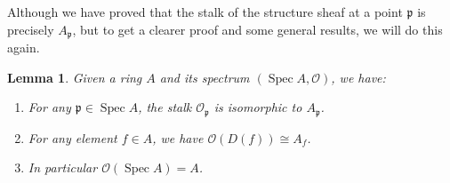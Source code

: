 \documentclass[12pt]{article}
\newtheorem{lemma}{Lemma}[subsection]
\theoremstyle{remark}
\newcommand{\Spec}[0]{\operatorname{Spec}}
\begin{document}
	Although we have proved that the stalk of the structure sheaf at a point $\mathfrak p$ is precisely $A_{\mathfrak p}$, but to get a clearer proof and some general results, we will do this again.
	\begin{lemma}\label{l213}
	Given a ring $A$ and its spectrum $(\Spec A, \mathscr O)$, we have:
	\begin{enumerate}[\normalfont(a)]
		\item For any $\mathfrak p\in\Spec A$, the stalk $\mathscr O_{\mathfrak p}$ is isomorphic to $A_{\mathfrak p}$.
		\item For any element $f\in A$, we have $\mathscr O(D(f))\cong A_f$.
		\item In particular $\mathscr O(\Spec A)=A$.
	\end{enumerate}
	\end{lemma}
\end{document}
